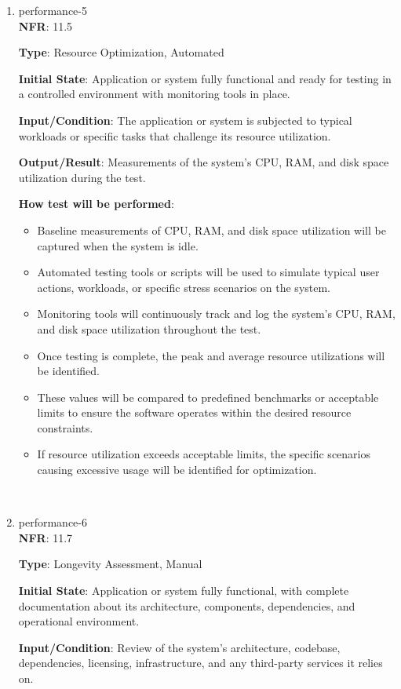 \documentclass[12pt, titlepage]{article}
\begin{document}
\begin{enumerate}
\item{performance-5 \\}
\textbf{NFR}: 11.5

\textbf{Type}: Resource Optimization, Automated

\textbf{Initial State}: Application or system fully functional and ready for testing in a controlled environment with monitoring tools in place.

\textbf{Input/Condition}: The application or system is subjected to typical workloads or specific tasks that challenge its resource utilization.

\textbf{Output/Result}: Measurements of the system's CPU, RAM, and disk space utilization during the test.

\textbf{How test will be performed}: 
\begin{itemize}[noitemsep]
    \item Baseline measurements of CPU, RAM, and disk space utilization will be captured when the system is idle.
    \item Automated testing tools or scripts will be used to simulate typical user actions, workloads, or specific stress scenarios on the system.
    \item Monitoring tools will continuously track and log the system's CPU, RAM, and disk space utilization throughout the test.
    \item Once testing is complete, the peak and average resource utilizations will be identified.
    \item These values will be compared to predefined benchmarks or acceptable limits to ensure the software operates within the desired resource constraints.
    \item If resource utilization exceeds acceptable limits, the specific scenarios causing excessive usage will be identified for optimization.
\end{itemize}\\

\item{performance-6 \\}
\textbf{NFR}: 11.7

\textbf{Type}: Longevity Assessment, Manual

\textbf{Initial State}: Application or system fully functional, with complete documentation about its architecture, components, dependencies, and operational environment.

\textbf{Input/Condition}: Review of the system's architecture, codebase, dependencies, licensing, infrastructure, and any third-party services it relies on.


\end{enumerate}
\end{document}
